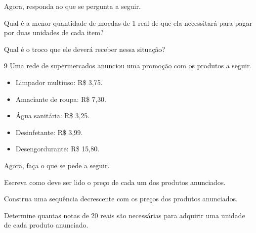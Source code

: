 \begin{mdframed}[linewidth=2pt,linecolor=salmao,roundcorner=2pt]
Agora, responda ao que se pergunta a seguir.

\begin{escolha}
\item
  Qual é a menor quantidade de moedas de 1 real de que ela necessitará para
  pagar por duas unidades de cada item?


\item
  Qual é o troco que ele deverá receber nessa situação?

\end{escolha}

\num{9} Uma rede de supermercados anunciou uma promoção com os produtos a seguir.

\begin{mdframed}[linewidth=2pt,linecolor=azul!20,backgroundcolor=azul!20,roundcorner=2pt]
\begin{itemize}
  \item Limpador multiuso: R\$ 3,75.
  \item Amaciante de roupa: R\$ 7,30.
  \item Água sanitária: R\$ 3,25.
  \item Desinfetante: R\$ 3,99.
  \item Desengordurante: R\$ 15,80.
\end{itemize}
\end{mdframed}

Agora, faça o que se pede a seguir.

\begin{escolha}
\item
  Escreva como deve ser lido o preço de cada um dos produtos anunciados.


\item
  Construa uma sequência decrescente com os preços dos produtos anunciados.


\item
  Determine quantas notas de 20 reais são necessárias para adquirir uma unidade de cada produto anunciado.


\end{escolha}
\end{mdframed}
